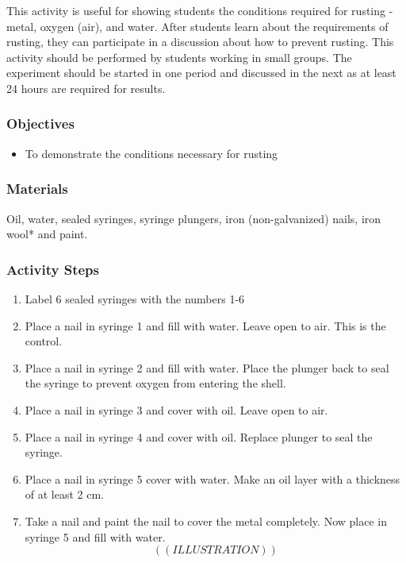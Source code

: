 This activity is useful for showing students the conditions required for rusting - metal, oxygen (air), and water. After students learn about the requirements of rusting, they can participate in a discussion about how to prevent rusting. This activity should be performed by students working in small groups. The experiment should be started in one period and discussed in the next as at least 24 hours are required for results.
\subsubsection*{Objectives}
\begin{itemize}
\item{To demonstrate the conditions necessary for rusting}
\end{itemize}

\subsubsection*{Materials}
Oil, water, sealed syringes, syringe plungers, iron (non-galvanized) nails, iron wool* and paint.

\subsubsection*{Activity Steps}
\begin{enumerate}
\item{Label 6 sealed syringes with the numbers 1-6}
\item{Place a nail in syringe 1 and fill with water. Leave open to air. This is the control.}
\item{Place a nail in syringe 2 and fill with water. Place the plunger back to seal the syringe to prevent oxygen from entering the shell.}
\item{Place a nail in syringe 3 and cover with oil. Leave open to air.}
\item{Place a nail in syringe 4 and cover with oil. Replace plunger to seal the syringe.}
\item{Place a nail in syringe 5 cover with water. Make an oil layer with a thickness of at least 2 cm.}
\item{Take a nail and paint the nail to cover the metal completely. Now place in syringe 5 and fill with water.}
$$((ILLUSTRATION))$$
\end{enumerate}


